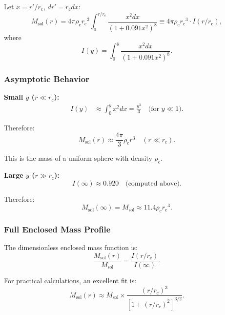 \documentclass[11pt,a4paper]{article}
\newcommand{\Msol}{\ensuremath{M_{\mathrm{sol}}}}
\newcommand{\rc}{\ensuremath{r_{\mathrm{c}}}}
\newcommand{\rhoc}{\ensuremath{\rho_{\mathrm{c}}}}
\theoremstyle{definition}
\theoremstyle{remark}
\begin{document}
Let $x = r'/\rc$, $dr' = \rc dx$:
\begin{equation}
M_{\mathrm{sol}}(r) = 4\pi \rhoc \rc^3 \int_0^{r/\rc} \frac{x^2 dx}{(1 + 0.091 x^2)^8} \equiv 4\pi \rhoc \rc^3 \cdot I(r/\rc),
\end{equation}
where
\begin{equation}
I(y) = \int_0^y \frac{x^2 dx}{(1 + 0.091 x^2)^8}.
\end{equation}

\subsubsection{Asymptotic Behavior}

\textbf{Small $y$ ($r \ll \rc$):}
\begin{align}
I(y) &\approx \int_0^y x^2 dx = \frac{y^3}{3} \quad \text{(for } y \ll 1\text{)}.
\end{align}

Therefore:
\begin{equation}
M_{\mathrm{sol}}(r) \approx \frac{4\pi}{3} \rhoc r^3 \quad (r \ll \rc).
\end{equation}

This is the mass of a uniform sphere with density $\rhoc$.

\textbf{Large $y$ ($r \gg \rc$):}
\begin{equation}
I(\infty) \approx 0.920 \quad \text{(computed above)}.
\end{equation}

Therefore:
\begin{equation}
M_{\mathrm{sol}}(\infty) = \Msol \approx 11.4 \rhoc \rc^3.
\end{equation}

\subsubsection{Full Enclosed Mass Profile}

The dimensionless enclosed mass function is:
\begin{equation}
\frac{M_{\mathrm{sol}}(r)}{\Msol} = \frac{I(r/\rc)}{I(\infty)}.
\end{equation}

For practical calculations, an excellent fit is:
\begin{equation}
\label{eq:enclosed_mass_fit}
\boxed{M_{\mathrm{sol}}(r) \approx \Msol \times \frac{(r/\rc)^3}{[1 + (r/\rc)^2]^{3/2}}.}
\end{equation}
\end{document}
